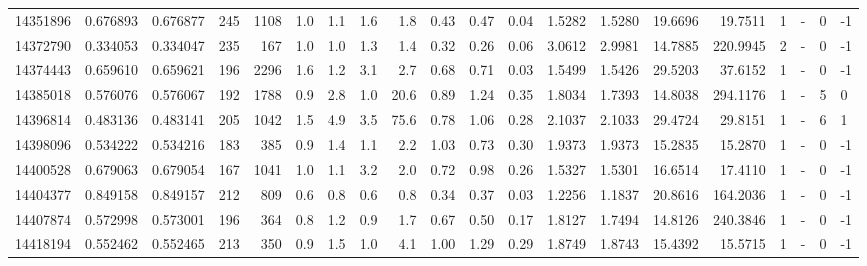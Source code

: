 \begin{tabular}{rrrrrrrrrrrrrrrrrlrl}
  14351896 & 0.676893 &   0.676877 &  245 & 1108 &      1.0 &      1.1 &     1.6 &      1.8 &       0.43 &        0.47 &        0.04 &  1.5282 &  1.5280 &   19.6696 &   19.7511 &       1 &             - &        0 &        -1 \\
  14372790 & 0.334053 &   0.334047 &  235 &  167 &      1.0 &      1.0 &     1.3 &      1.4 &       0.32 &        0.26 &        0.06 &  3.0612 &  2.9981 &   14.7885 &  220.9945 &       2 &             - &        0 &        -1 \\
  14374443 & 0.659610 &   0.659621 &  196 & 2296 &      1.6 &      1.2 &     3.1 &      2.7 &       0.68 &        0.71 &        0.03 &  1.5499 &  1.5426 &   29.5203 &   37.6152 &       1 &             - &        0 &        -1 \\
  14385018 & 0.576076 &   0.576067 &  192 & 1788 &      0.9 &      2.8 &     1.0 &     20.6 &       0.89 &        1.24 &        0.35 &  1.8034 &  1.7393 &   14.8038 &  294.1176 &       1 &             - &        5 &         0 \\
  14396814 & 0.483136 &   0.483141 &  205 & 1042 &      1.5 &      4.9 &     3.5 &     75.6 &       0.78 &        1.06 &        0.28 &  2.1037 &  2.1033 &   29.4724 &   29.8151 &       1 &             - &        6 &         1 \\
  14398096 & 0.534222 &   0.534216 &  183 &  385 &      0.9 &      1.4 &     1.1 &      2.2 &       1.03 &        0.73 &        0.30 &  1.9373 &  1.9373 &   15.2835 &   15.2870 &       1 &             - &        0 &        -1 \\
  14400528 & 0.679063 &   0.679054 &  167 & 1041 &      1.0 &      1.1 &     3.2 &      2.0 &       0.72 &        0.98 &        0.26 &  1.5327 &  1.5301 &   16.6514 &   17.4110 &       1 &             - &        0 &        -1 \\
  14404377 & 0.849158 &   0.849157 &  212 &  809 &      0.6 &      0.8 &     0.6 &      0.8 &       0.34 &        0.37 &        0.03 &  1.2256 &  1.1837 &   20.8616 &  164.2036 &       1 &             - &        0 &        -1 \\
  14407874 & 0.572998 &   0.573001 &  196 &  364 &      0.8 &      1.2 &     0.9 &      1.7 &       0.67 &        0.50 &        0.17 &  1.8127 &  1.7494 &   14.8126 &  240.3846 &       1 &             - &        0 &        -1 \\
  14418194 & 0.552462 &   0.552465 &  213 &  350 &      0.9 &      1.5 &     1.0 &      4.1 &       1.00 &        1.29 &        0.29 &  1.8749 &  1.8743 &   15.4392 &   15.5715 &       1 &             - &        0 &        -1 \\

\end{tabular}
